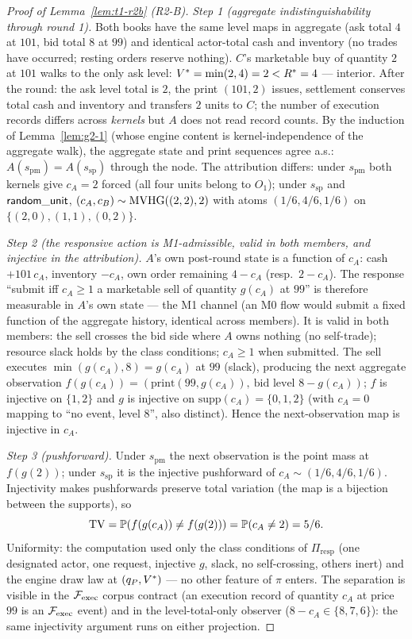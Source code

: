 
\begin{proof}[Proof of Lemma~\ref{lem:t1-r2b} (R2-B)]
\emph{Step 1 (aggregate indistinguishability through round 1).} Both books
have the same level maps in aggregate (ask total $4$ at $101$, bid total
$8$ at $99$) and identical actor-total cash and inventory (no trades have
occurred; resting orders reserve nothing). $C$'s marketable buy of
quantity $2$ at $101$ walks to the only ask level:
$V^{*} = \min(2, 4) = 2 < R^{*} = 4$ --- interior. After the round: the
ask level total is $2$, the print $(101,2)$ issues, settlement conserves
total cash and inventory and transfers $2$ units to $C$; the number of
execution records differs across \emph{kernels} but $A$ does not read
record counts. By the induction of Lemma~\ref{lem:g2-1} (whose engine
content is kernel-independence of the aggregate walk), the aggregate state
and print sequences agree a.s.: $A(s_{\mathrm{pm}}) = A(s_{\mathrm{sp}})$
through the node. The attribution differs: under $s_{\mathrm{pm}}$ both
kernels give $c_A = 2$ forced (all four units belong to $O_1$); under
$s_{\mathrm{sp}}$ and $\mathsf{random\_unit}$, $(c_A, c_B) \sim \operatorname{MVHG}((2,2), 2)$ with atoms
$(1/6, 4/6, 1/6)$ on $\{(2,0),(1,1),(0,2)\}$.

\emph{Step 2 (the responsive action is M1-admissible, valid in both
members, and injective in the attribution).} $A$'s own post-round state is
a function of $c_A$: cash $+101\,c_A$, inventory $-c_A$, own order
remaining $4 - c_A$ (resp.\ $2 - c_A$). The response ``submit iff
$c_A \geq 1$ a marketable sell of quantity $g(c_A)$ at $99$'' is therefore
measurable in $A$'s own state --- the M1 channel (an M0 flow would submit
a fixed function of the aggregate history, identical across members). It
is valid in both members: the sell crosses the bid side where $A$ owns
nothing (no self-trade); resource slack holds by the class conditions;
$c_A \geq 1$ when submitted. The sell executes $\min(g(c_A), 8) = g(c_A)$
at $99$ (slack), producing the next aggregate observation
$f(g(c_A)) = (\text{print}(99, g(c_A)),\ \text{bid level } 8 - g(c_A))$;
$f$ is injective on $\{1,2\}$ and $g$ is injective on
$\mathrm{supp}(c_A) = \{0,1,2\}$ (with $c_A = 0$ mapping to ``no event,
level $8$'', also distinct). Hence the next-observation map is injective
in $c_A$.

\emph{Step 3 (pushforward).} Under $s_{\mathrm{pm}}$ the next observation
is the point mass at $f(g(2))$; under $s_{\mathrm{sp}}$ it is the
injective pushforward of $c_A \sim (1/6, 4/6, 1/6)$. Injectivity makes
pushforwards preserve total variation (the map is a bijection between the
supports), so
\[
\operatorname{TV} = \mathbb{P}(f(g(c_A)) \ne f(g(2))) = \mathbb{P}(c_A \ne 2) = 5/6 .
\]
Uniformity: the computation used only the class conditions of
$\Pi_{\mathrm{resp}}$ (one designated actor, one request, injective $g$,
slack, no self-crossing, others inert) and the engine draw law at
$(q_{P}, V^{*})$ --- no other feature of $\pi$ enters. The separation is
visible in the $\mathcal{F}_{\mathrm{exec}}$ corpus contract (an execution record of quantity
$c_A$ at price $99$ is an $\mathcal{F}_{\mathrm{exec}}$ event) and in the level-total-only
observer ($8 - c_A \in \{8,7,6\}$): the same injectivity argument runs on
either projection.
\end{proof}

